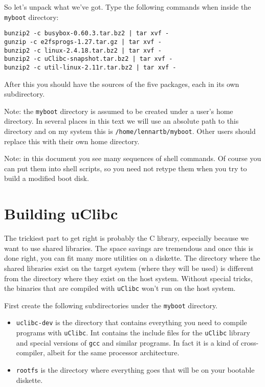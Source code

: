 \documentclass[12pt,a4paper]{article}
\begin{document}
So let's unpack what we've got. Type the following commands when
inside the {\tt myboot} directory:
\begin{verbatim}
bunzip2 -c busybox-0.60.3.tar.bz2 | tar xvf -
gunzip -c e2fsprogs-1.27.tar.gz | tar xvf -
bunzip2 -c linux-2.4.18.tar.bz2 | tar xvf -
bunzip2 -c uClibc-snapshot.tar.bz2 | tar xvf -
bunzip2 -c util-linux-2.11r.tar.bz2 | tar xvf -
\end{verbatim}
After this you should have the sources of  the five packages,
each in its own subdirectory.

Note: the {\tt myboot} directory is assumed to be created under a
user's home directory. In several places in this text we will use an
absolute path to this directory and on my system this is 
{\tt /home/lennartb/myboot}. Other users should replace this with their
own home directory.

Note: in this document you see many sequences of shell commands. Of
course you can put them into shell scripts, so you need not retype
them when you try to build a modified boot disk.

\section{Building uClibc}

The trickiest part to get right is probably the C library, especially
because we want to use shared libraries. The space savings are
tremendous and once this is done right, you can fit many more
utilities on a diskette. The directory where the shared libraries exist
on the target system (where they will be used) is different from the
directory where they exist on the host system. Without special tricks,
the binaries that are compiled with {\tt uClibc} won't run on the host
system. 

First create the following subdirectories under the {\tt myboot}
directory.
\begin{itemize}
\item {\tt uclibc-dev} is the directory that contains everything you
  need to compile programs with {\tt uClibc}. Int contains the include
  files for the {\tt uClibc} library and special versions of {\tt gcc}
  and similar programs. In fact it is a kind of cross-compiler, albeit
  for the same processor architecture.
\item {\tt rootfs} is the directory where everything goes that will be
  on your bootable diskette.
\end{itemize}
\end{document}
